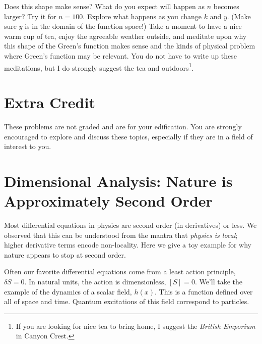 \documentclass[12pt]{article}
\numberwithin{equation}{section}    %
\begin{document}
Does this shape make sense? What do you expect will happen as $n$ becomes larger? Try it for $n=100$. Explore what happens as you change $k$ and $y$. (Make sure $y$ is in the domain of the function space!) Take a moment to have a nice warm cup of tea, enjoy the agreeable weather outside, and meditate upon why this shape of the Green's function makes sense and the kinds of physical problem where Green's function may be relevant. You do not have to write up these meditations, but I do strongly suggest the tea and outdoors\footnote{If you are looking for nice tea to bring home, I suggest the \emph{British Emporium} in Canyon Crest.}.  





\appendix
\section*{\Large Extra Credit}


These problems are not graded and are for your edification. You are strongly encouraged to explore and discuss these topics, especially if they are in a field of interest to you.

\section{Dimensional Analysis: Nature is Approximately Second Order} 

Most differential equations in physics are second order (in derivatives) or less. We observed that this can be understood from the mantra that \emph{physics is local}; higher derivative terms encode non-locality. Here we give a toy example for why nature appears to stop at second order.

Often our favorite differential equations come from a least action principle, $\delta S = 0$. In natural units, the action is dimensionless, $[S]=0$. We'll take the example of the dynamics of a scalar field, $h(x)$. This is a function defined over all of space and time. Quantum excitations of this field correspond to particles.
\end{document}
